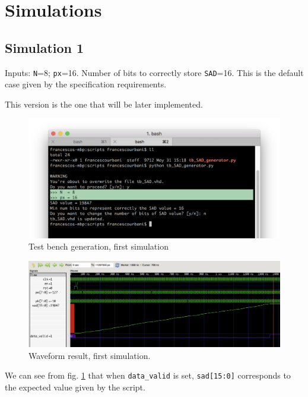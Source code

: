 \documentclass[12pt, a4paper]{article}
\begin{document}
\newpage
\section{Simulations}

\subsection{Simulation 1}

Inputs: \texttt{N}=8; \texttt{px}=16. Number of bits to correctly store \texttt{SAD}=16. This is the default case given by the specification requirements. 

This version is the one that will be later implemented.

\begin{figure}[h!]
\includegraphics[scale=0.5]{../screenshots/gtkwave/sim1_term.png}
\caption{Test bench generation, first simulation}%
\end{figure}


\begin{figure}[h!]
\includegraphics[scale=0.18]{../screenshots/gtkwave/sim1_gtkwave.png}
\caption{Waveform result, first simulation.}\label{fig:wave1}
\end{figure}

We can see from fig. \ref{fig:wave1} that when \texttt{data\_valid} is set, \texttt{sad[15:0]} corresponds to the expected value given by the script.
\end{document}
